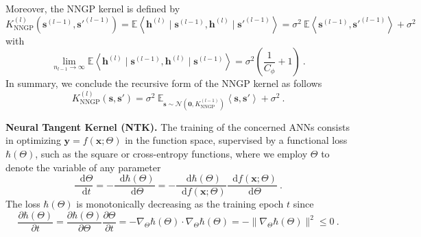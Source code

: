 \documentclass[review,10pt]{JMtemplate}
\newcommand*{\dif}{\mathop{}\!\mathrm{d}}
\begin{document}
Moreover, the NNGP kernel is defined by
\[
K_{\textrm{NNGP}}^{(l)} \left( \boldsymbol{s}^{(l-1)}, \boldsymbol{s}'^{(l-1)} \right) 
= \mathbb{E} \left\langle \boldsymbol{h}^{(l)} \mid \boldsymbol{s}^{(l-1)}, \boldsymbol{h}^{(l)} \mid \boldsymbol{s}'^{(l-1)}  \right\rangle
= \sigma^2 ~\mathbb{E} \left\langle\boldsymbol{s}^{(l-1)},  \boldsymbol{s}'^{(l-1)}  \right\rangle + \sigma^2 
\]
with
\[
\lim\limits_{n_{l-1} \to \infty} \mathbb{E} \left\langle \boldsymbol{h}^{(l)} \mid \boldsymbol{s}^{(l-1)}, \boldsymbol{h}^{(l)} \mid \boldsymbol{s}^{(l-1)}  \right\rangle = \sigma^2 \left( \frac{1}{C_{\phi}} + 1 \right)  \ .
\]
In summary, we conclude the recursive form of the NNGP kernel as follows
\[
K_{\textrm{NNGP}}^{(l)} \left( \boldsymbol{s}, \boldsymbol{s}' \right) 
= \sigma^2~ \mathbb{E}_{ \boldsymbol{s} \sim \mathcal{N}(\boldsymbol{0}, K_{\textrm{NNGP}}^{(l-1)} )} \left\langle\boldsymbol{s},  \boldsymbol{s}' \right\rangle  + \sigma^2  \ .
\]


\vspace{0.2 cm}
\noindent\textbf{Neural Tangent Kernel (NTK).} The training of the concerned ANNs consists in optimizing $\boldsymbol{y} = f(\boldsymbol{x} ; \Theta)$ in the function space, supervised by a functional loss $\hbar(\Theta)$, such as the square or cross-entropy functions, where we employ $\Theta$ to denote the variable of any parameter
\[
\frac{\dif \Theta}{\dif t} = - \frac{\dif \hbar(\Theta)}{\dif \Theta} = - \frac{\dif \hbar(\Theta)}{\dif f(\boldsymbol{x} ; \Theta)} \frac{\dif f(\boldsymbol{x} ; \Theta)}{\dif \Theta} \ .
\]
The loss $\hbar(\Theta)$ is monotonically decreasing as the training epoch $t$ since
\[
\frac{\partial \hbar(\Theta)}{\partial t} = \frac{ \partial \hbar(\Theta) }{\partial \Theta} \frac{ \partial \Theta }{\partial t}  = - \nabla_{\Theta} \hbar(\Theta)  \cdot \nabla_{\Theta} \hbar(\Theta)  = - \|  \nabla_{\Theta} \hbar(\Theta) \|^2  \leq 0	\ .
\]
\end{document}
